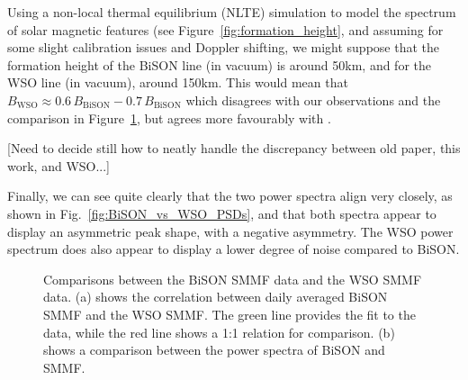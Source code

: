 Using a non-local thermal equilibrium (NLTE) simulation to model the spectrum of solar magnetic features (see Figure~\ref{fig:formation_height}, and assuming for some slight calibration issues and Doppler shifting, we might suppose that the formation height of the BiSON line (in vacuum) is around 50km, and for the WSO line (in vacuum), around 150km. This would mean that $B_\mathrm{WSO} \approx 0.6\, B_\mathrm{BiSON} - 0.7 \, B_\mathrm{BiSON}$ which disagrees with our observations and the comparison in Figure~\ref{fig:BiSON_vs_WSO}, but agrees more favourably with \citet{chaplin_studies_2003}.

[Need to decide still how to neatly handle the discrepancy between old paper, this work, and WSO...]


Finally, we can see quite clearly that the two power spectra align very closely, as shown in Fig.~\ref{fig:BiSON_vs_WSO_PSDs}, and that both spectra appear to display an asymmetric peak shape, with a negative asymmetry. The WSO power spectrum does also appear to display a lower degree of noise compared to BiSON.

\begin{figure}[ht!]
	\centering
	\qquad
	\caption{Comparisons between the BiSON SMMF data and the WSO SMMF data. (a) shows the correlation between daily averaged BiSON SMMF and the WSO SMMF. The green line provides the fit to the data, while the red line shows a 1:1 relation for comparison. (b) shows a comparison between the power spectra of BiSON and SMMF.} \label{fig:BiSON_vs_WSO}
\end{figure}

